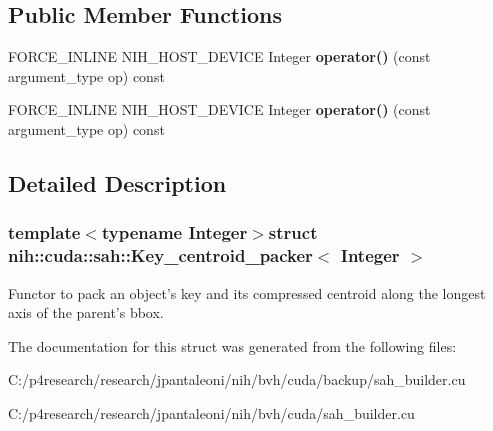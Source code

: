 \subsection*{\-Public \-Member \-Functions}
\begin{DoxyCompactItemize}
\item 
\hypertarget{structnih_1_1cuda_1_1sah_1_1_key__centroid__packer_a18ed3fc9ce51a51c91820d0f6140efd7}{
\-F\-O\-R\-C\-E\-\_\-\-I\-N\-L\-I\-N\-E \-N\-I\-H\-\_\-\-H\-O\-S\-T\-\_\-\-D\-E\-V\-I\-C\-E \*
\-Integer {\bfseries operator()} (const argument\-\_\-type op) const }
\label{structnih_1_1cuda_1_1sah_1_1_key__centroid__packer_a18ed3fc9ce51a51c91820d0f6140efd7}

\item 
\hypertarget{structnih_1_1cuda_1_1sah_1_1_key__centroid__packer_a18ed3fc9ce51a51c91820d0f6140efd7}{
\-F\-O\-R\-C\-E\-\_\-\-I\-N\-L\-I\-N\-E \-N\-I\-H\-\_\-\-H\-O\-S\-T\-\_\-\-D\-E\-V\-I\-C\-E \*
\-Integer {\bfseries operator()} (const argument\-\_\-type op) const }
\label{structnih_1_1cuda_1_1sah_1_1_key__centroid__packer_a18ed3fc9ce51a51c91820d0f6140efd7}

\end{DoxyCompactItemize}


\subsection{\-Detailed \-Description}
\subsubsection*{template$<$typename Integer$>$struct nih\-::cuda\-::sah\-::\-Key\-\_\-centroid\-\_\-packer$<$ Integer $>$}

\-Functor to pack an object's key and its compressed centroid along the longest axis of the parent's bbox. 

\-The documentation for this struct was generated from the following files\-:\begin{DoxyCompactItemize}
\item 
\-C\-:/p4research/research/jpantaleoni/nih/bvh/cuda/backup/sah\-\_\-builder.\-cu\item 
\-C\-:/p4research/research/jpantaleoni/nih/bvh/cuda/sah\-\_\-builder.\-cu\end{DoxyCompactItemize}
